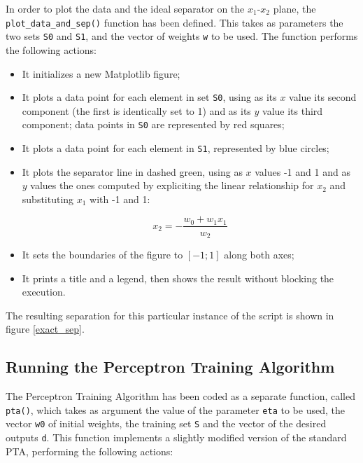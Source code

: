 \documentclass[letterpaper,headings=standardclasses]{scrartcl}
\begin{document}
In order to plot the data and the ideal separator on the $x_1$-$x_2$ plane, the \texttt{plot\_data\_and\_sep()} function has been defined. This takes as parameters the two sets \texttt{S0} and \texttt{S1}, and the vector of weights \texttt{w} to be used. The function performs the following actions:

\begin{itemize}

\item It initializes a new Matplotlib figure;

\item It plots a data point for each element in set \texttt{S0}, using as its $x$ value its second component (the first is identically set to 1) and as its $y$ value its third component; data points in \texttt{S0} are represented by red squares;

\item It plots a data point for each element in \texttt{S1}, represented by blue circles;

\item It plots the separator line in dashed green, using as $x$ values -1 and 1 and as $y$ values the ones computed by expliciting the linear relationship for $x_2$ and substituting $x_1$ with -1 and 1:

$$ x_2 = -\frac{w_0 + w_1 x_1}{w_2} $$

\item It sets the boundaries of the figure to $[-1;1]$ along both axes;

\item It prints a title and a legend, then shows the result without blocking the execution.

\end{itemize}

The resulting separation for this particular instance of the script is shown in figure \ref{exact_sep}.

\subsection{Running the Perceptron Training Algorithm}

The Perceptron Training Algorithm has been coded as a separate function, called \texttt{pta()}, which takes as argument the value of the parameter \texttt{eta} to be used, the vector \texttt{w0} of initial weights, the training set \texttt{S} and the vector of the desired outputs \texttt{d}. This function implements a slightly modified version of the standard PTA, performing the following actions:
\end{document}
